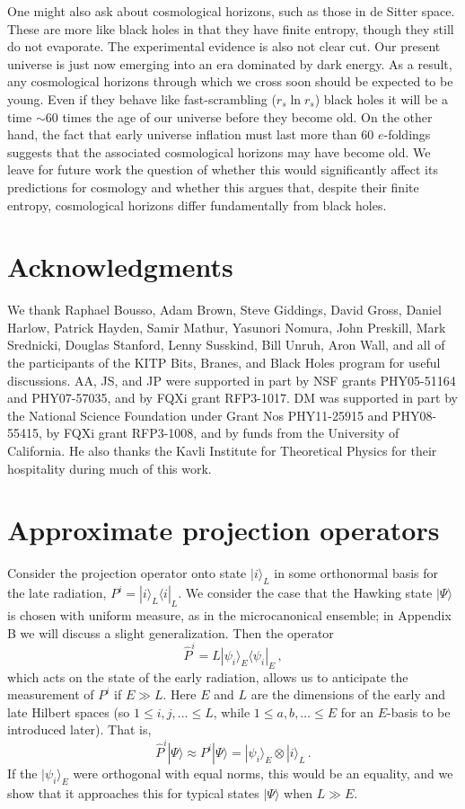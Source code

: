 \documentclass[12pt]{article}
\newcommand{\sect}[1]{\section{#1}\setcounter{equation}{0}}
\begin{document}
One might also ask about cosmological horizons, such as those in de Sitter space.  These are more like black holes in that they have finite entropy, though they still do not evaporate.  The experimental evidence is also not clear cut.  Our present universe is just now emerging into an era dominated by dark energy.  As a result, any cosmological horizons through which we cross soon should be expected to be young.  Even if they behave like fast-scrambling ($r_s \ln r_s$) black holes it will be a time $\sim 60$ times the age of our universe before they become old.  On the other hand, the fact that early universe inflation must last more than 60 $e$-foldings suggests that the associated cosmological horizons may have become old.  We leave for future work the question of whether this would significantly affect its predictions for cosmology and whether this argues that, despite their finite entropy, cosmological horizons differ fundamentally from black holes.



\section*{Acknowledgments}
We thank Raphael Bousso, Adam Brown, Steve Giddings, David Gross, Daniel Harlow, Patrick Hayden, Samir Mathur, Yasunori Nomura, John Preskill, Mark Srednicki, Douglas Stanford,  Lenny Susskind, Bill Unruh, Aron Wall, and all of the participants of the KITP Bits, Branes, and Black Holes program for useful discussions.
AA, JS, and JP were supported in part by NSF grants PHY05-51164 and PHY07-57035, and by FQXi grant RFP3-1017.  DM was supported in
part by the National Science Foundation under Grant Nos PHY11-25915
and PHY08-55415, by FQXi grant RFP3-1008, and by funds from the University of California.  He also thanks the Kavli Institute for Theoretical Physics for their hospitality during much of this work.

\appendix

\sect{Approximate projection operators}
\label{approx}


Consider the projection operator onto state $|i\rangle_L$ in some orthonormal basis for the late radiation, $P^i = |i\rangle_L \langle i |_L$.
We consider the case that the Hawking state $|\Psi\rangle$ is chosen with uniform measure, as in the microcanonical ensemble; in Appendix B we will discuss a slight generalization.  Then
 the operator
\begin{equation}
\hat P^i = L |\psi_i\rangle_E \langle \psi_i |_E \,,
\end{equation}
which acts on the state of the early radiation, allows us to anticipate the measurement of $P^i$ if $E \gg L$.  Here $E$ and $L$ are the dimensions of the early and late Hilbert spaces (so $1 \leq i,j,\ldots \leq L$, while $1 \leq a,b,\ldots \leq E$ for an $E$-basis to be introduced later).  That is,
\begin{equation}
\hat P^i  |\Psi\rangle \approx P^i |\Psi\rangle =  |\psi_i\rangle_E \otimes |i\rangle_L  \,.
\end{equation}
If the $ |\psi_i\rangle_E$ were orthogonal with equal norms, this would be an equality, and we show that it approaches this for typical states $|\Psi\rangle$ when $L \gg E$.
\end{document}

